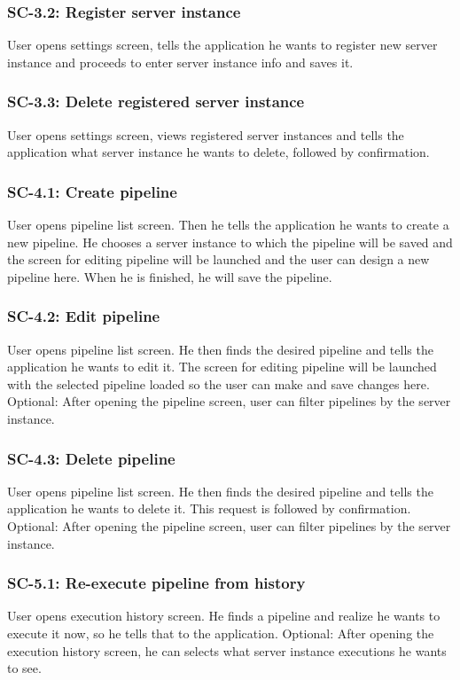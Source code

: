 \subsubsection*{SC-3.2: Register server instance}
User opens settings screen, tells the application he wants to register new server instance and proceeds to enter server instance info and saves it.
\subsubsection*{SC-3.3: Delete registered server instance}
User opens settings screen, views registered server instances and tells the application what server instance he wants to delete, followed by confirmation.
\subsubsection*{SC-4.1: Create pipeline}
User opens pipeline list screen. Then he tells the application he wants to create a new pipeline. He chooses a server instance to which the pipeline will be saved and the screen for editing pipeline will be launched and the user can design a new pipeline here. When he is finished, he will save the pipeline.
\subsubsection*{SC-4.2: Edit pipeline}
User opens pipeline list screen. He then finds the desired pipeline and tells the application he wants to edit it. The screen for editing pipeline will be launched with the selected pipeline loaded so the user can make and save changes here. Optional: After opening the pipeline screen, user can filter pipelines by the server instance.
\subsubsection*{SC-4.3: Delete pipeline}
User opens pipeline list screen. He then finds the desired pipeline and tells the application he wants to delete it. This request is followed by confirmation. Optional: After opening the pipeline screen, user can filter pipelines by the server instance.
\subsubsection*{SC-5.1: Re-execute pipeline from history}
User opens execution history screen. He finds a pipeline and realize he wants to execute it now, so he tells that to the application. Optional: After opening the execution history screen, he can selects what server instance executions he wants to see.
